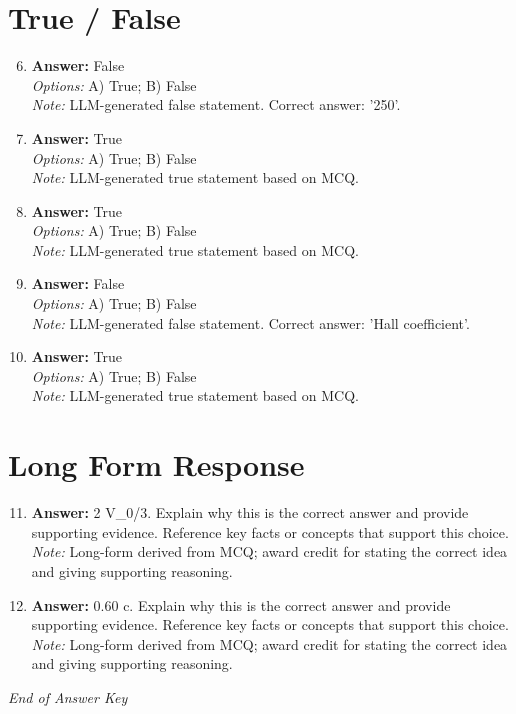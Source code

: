 \documentclass[12pt]{article}
\begin{document}
\section*{True / False}
\begin{enumerate}[label=\arabic*.]
\setcounter{enumi}{5}
\item \textbf{Answer:} False
\\ \textit{Options:} A) True; B) False
\\ \textit{Note:} LLM-generated false statement. Correct answer: '250'.
\item \textbf{Answer:} True
\\ \textit{Options:} A) True; B) False
\\ \textit{Note:} LLM-generated true statement based on MCQ.
\item \textbf{Answer:} True
\\ \textit{Options:} A) True; B) False
\\ \textit{Note:} LLM-generated true statement based on MCQ.
\item \textbf{Answer:} False
\\ \textit{Options:} A) True; B) False
\\ \textit{Note:} LLM-generated false statement. Correct answer: 'Hall coefficient'.
\item \textbf{Answer:} True
\\ \textit{Options:} A) True; B) False
\\ \textit{Note:} LLM-generated true statement based on MCQ.
\end{enumerate}

\section*{Long Form Response}
\begin{enumerate}[label=\arabic*.]
\setcounter{enumi}{10}
\item \textbf{Answer:} 2 V\_0/3. Explain why this is the correct answer and provide supporting evidence. Reference key facts or concepts that support this choice.
\\ \textit{Note:} Long-form derived from MCQ; award credit for stating the correct idea and giving supporting reasoning.
\item \textbf{Answer:} 0.60 c. Explain why this is the correct answer and provide supporting evidence. Reference key facts or concepts that support this choice.
\\ \textit{Note:} Long-form derived from MCQ; award credit for stating the correct idea and giving supporting reasoning.
\end{enumerate}

\vfill
\noindent\textit{End of Answer Key}
\end{document}

